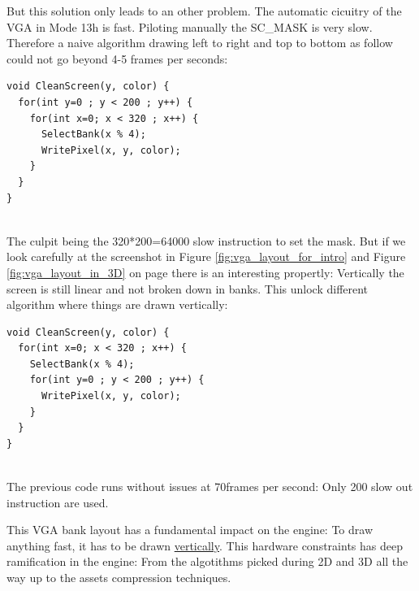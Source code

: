 \documentclass[book.tex]{subfiles}
\begin{document}
\par
But this solution only leads to an other problem. The automatic cicuitry of the VGA in Mode 13h is fast. Piloting manually the SC\_MASK is very slow. Therefore a naive algorithm drawing left to right and top to bottom as follow could not go beyond 4-5 frames per seconds:\\
\begin{verbatim}
void CleanScreen(y, color) {
  for(int y=0 ; y < 200 ; y++) {
    for(int x=0; x < 320 ; x++) {
      SelectBank(x % 4);
      WritePixel(x, y, color);   
    }
  }
}
\end{verbatim}\\
The culpit being the 320*200=64000 slow instruction to set the mask. But if we look carefully at the screenshot in Figure \ref{fig:vga_layout_for_intro} and Figure \ref{fig:vga_layout_in_3D} on page \pageref{fig:vga_layout_in_3D} there is an interesting propertly: Vertically the screen is still linear and not broken down in banks. This unlock different algorithm where things are drawn vertically:\\

\begin{verbatim}
void CleanScreen(y, color) {
  for(int x=0; x < 320 ; x++) {
    SelectBank(x % 4);
    for(int y=0 ; y < 200 ; y++) {
      WritePixel(x, y, color);   
    }
  }
}
\end{verbatim}\\
The previous code runs without issues at 70frames per second: Only 200 slow out instruction are used.\\
\par
This VGA bank layout has a fundamental impact on the engine: To draw anything fast, it has to be drawn \underline{vertically}. This hardware constraints has deep ramification in the engine: From the algotithms picked during 2D and 3D all the way up to the assets compression techniques.\\
\end{document}
